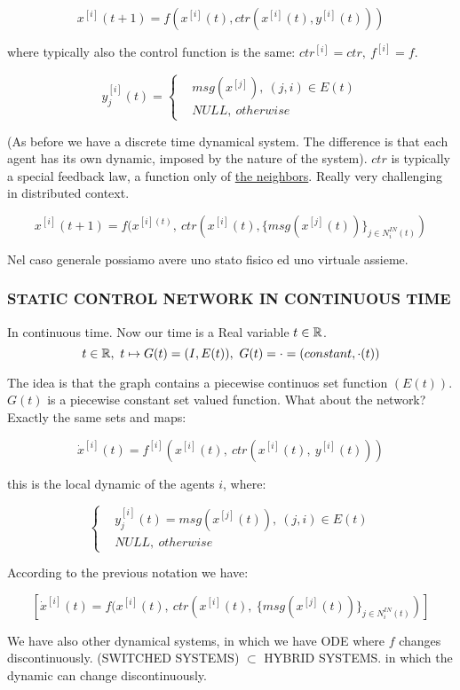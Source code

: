\[
	x^{[i]}(t+1) = f(x^{[i]}(t), ctr(x^{[i]}(t),y^{[i]}(t)))
\]

where typically also the control function is the same: $ctr^{[i]}=ctr,\ f^{[i]}=f$.

\[
	y^{[i]}_j(t) = \left\{
	\begin{aligned}
	&msg(x^{[j]}),\ (j,i)\in E(t) \\
	&NULL,\ otherwise
	\end{aligned} 
	\right.
\]

(As before we have a discrete time dynamical system. The difference is that each agent has its own dynamic, imposed by the nature of the system). $ctr$ is typically a special feedback law, a function only of \underline{the neighbors}. 
Really very challenging in distributed context.

\[
	x^{[i]}(t+1) = f(x^{[i](t)},\ ctr(x^{[i]}(t),\{msg(x^{[j]}(t))\}_{j\in N_i^{IN}(t)})
\]

Nel caso generale possiamo avere uno stato fisico ed uno virtuale assieme.

\subsubsection{STATIC CONTROL NETWORK IN CONTINUOUS TIME}

In continuous time. Now our time is a Real variable $t \in \mathbb{R}$.
\[
	t\in\R,\ t\mapsto G(t)=(I,E(t)),\ G(t)=\mathord{\cdot}=(constant,\mathord{\cdot}(t))
\]

The idea is that the graph contains a piecewise continuos set function $(E(t))$. 
$G(t)$ is a piecewise constant set valued function. What about the network? Exactly the same sets and maps:

\[
	\dot{x}^{[i]}(t) = f^{[i]}(x^{[i]}(t),\ ctr(x^{[i]}(t),\ y^{[i]}(t)))
\]

this is the local dynamic of the agents $i$, where:

\[
	\left\{
	\begin{aligned}
	&y^{[i]}_j(t) = msg(x^{[j]}(t)),\ (j,i)\in E(t) \\
	&NULL,\ otherwise
	\end{aligned} 
	\right.
\]

According to the previous notation we have:

\[
	[\dot{x}^{[i]}(t) = f(x^{[i]}(t),\ ctr(x^{[i]}(t),\ \{msg(x^{[j]}(t))\}_{j\in N_i^{IN}(t)})]
\]

We have also other dynamical systems, in which we have ODE where $f$ changes discontinuously. (SWITCHED SYSTEMS) $\subset$ HYBRID SYSTEMS. in which the dynamic can change discontinuously.

